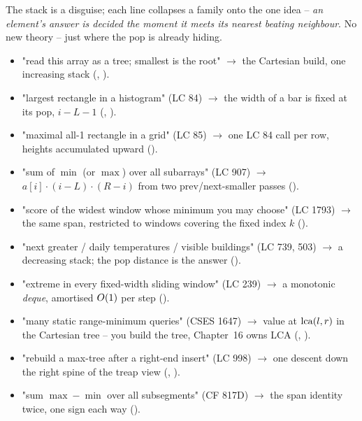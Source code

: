 
The stack is a disguise; each line collapses a family onto the one idea -- \emph{an element's answer is
decided the moment it meets its nearest beating neighbour}. No new theory -- just where the pop is already
hiding.

\begin{itemize}[nosep, leftmargin=1.4em]
  \item "read this array as a tree; smallest is the root" $\longrightarrow$ the Cartesian build, one
        increasing stack (, ).
  \item "largest rectangle in a histogram" (LC 84) $\longrightarrow$ the width of a bar is fixed at its pop,
        $i-L-1$ (, ).
  \item "maximal all-1 rectangle in a grid" (LC 85) $\longrightarrow$ one LC 84 call per row, heights
        accumulated upward ().
  \item "sum of $\min$ (or $\max$) over all subarrays" (LC 907) $\longrightarrow$ $a[i]\cdot(i-L)\cdot(R-i)$
        from two prev/next-smaller passes ().
  \item "score of the widest window whose minimum you may choose" (LC 1793) $\longrightarrow$ the same span,
        restricted to windows covering the fixed index $k$ ().
  \item "next greater / daily temperatures / visible buildings" (LC 739, 503) $\longrightarrow$ a decreasing
        stack; the pop distance is the answer ().
  \item "extreme in every fixed-width sliding window" (LC 239) $\longrightarrow$ a monotonic \emph{deque},
        amortised $O(1)$ per step ().
  \item "many static range-minimum queries" (CSES 1647) $\longrightarrow$ value at $\operatorname{lca}(l,r)$ in the
        Cartesian tree -- you build the tree, Chapter~16 owns LCA (, ).
  \item "rebuild a max-tree after a right-end insert" (LC 998) $\longrightarrow$ one descent down the
        right spine of the treap view (, ).
  \item "sum $\max-\min$ over all subsegments" (CF 817D) $\longrightarrow$ the span identity twice, one sign
        each way ().
\end{itemize}

